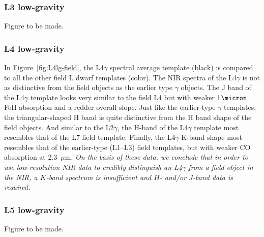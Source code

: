 \documentclass[12pt,preprint]{aastex}
\begin{document}
\subsubsection{L3 low-gravity}
Figure to be made.

\subsubsection{L4 low-gravity}
In Figure~\ref{fig:L4lg-field}, the L4$\gamma$ spectral average template (black) is compared to all the other field L dwarf templates (color). 
The NIR spectra of the L4$\gamma$ is not as distinctive from the field objects as the earlier type $\gamma$ objects. 
The J band of the L4$\gamma$ template looks very similar to the field L4 but with weaker 1$\micron$ FeH absorption and a redder overall slope. 
Just like the earlier-type $\gamma$ templates, the triangular-shaped H band is quite distinctive from the H band shape of the field objects. And similar to the L2$\gamma$, the H-band of the L4$\gamma$ template most resembles that of the L7 field template.
Finally, the L4$\gamma$ K-band shape most resembles that of the earlier-type (L1--L3) field templates, but with weaker CO absorption at 2.3~$\mu$m.
\emph{On the basis of these data, we conclude that in order to use low-resolution NIR data to credibly distinguish an L4$\gamma$ from a field object in the NIR, a $K$-band spectrum is insufficient and $H$- and/or $J$-band data is required.}

\subsubsection{L5 low-gravity}
Figure to be made.


% 
\end{document}
